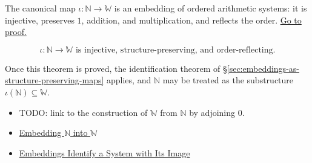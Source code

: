 \begin{tcolorbox}[colback=thmbox, colframe=thmborder, arc=2pt,
  left=6pt, right=6pt, top=4pt, bottom=4pt,
  title={\small\textbf{Theorem ($\mathbb{N}$ Embeds in $\mathbb{W}$)}},
  fonttitle=\small\bfseries]
\begin{theorem}
\label{thm:n-embeds-in-w}
The canonical map $\iota:\mathbb{N}\to \mathbb{W}$ is an embedding of ordered arithmetic systems: it is injective, preserves $1$, addition, and multiplication, and reflects the order.
\hyperref[prf:n-embeds-in-w]{Go to proof.}
\end{theorem}
\end{tcolorbox}
\begin{remark*}
\[
\iota:\mathbb{N}\to \mathbb{W} \text{ is injective, structure-preserving, and order-reflecting.}
\]
\end{remark*}
\begin{remark*}[Interpretation]
Once this theorem is proved, the identification theorem of \S\ref{sec:embeddings-as-structure-preserving-maps} applies, and $\mathbb{N}$ may be treated as the substructure $\iota(\mathbb{N})\subseteq \mathbb{W}$.
\end{remark*}
\begin{dependencies}
\begin{itemize}
  \item TODO: link to the construction of $\mathbb{W}$ from $\mathbb{N}$ by adjoining $0$.
  \item \hyperref[def:embedding-n-into-w]{Embedding $\mathbb{N}$ into $\mathbb{W}$}
  \item \hyperref[thm:embedding-identifies-with-image]{Embeddings Identify a System with Its Image}
\end{itemize}
\end{dependencies}
